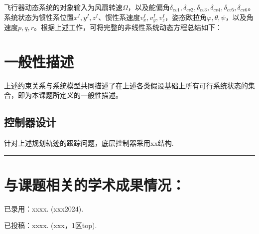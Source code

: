 \begin{ubox}
飞行器动态系统的对象输入为风扇转速$\Omega$，以及舵偏角$\delta_{cv1},\delta_{cv2},\delta_{cv3},\delta_{cv4},\delta_{cv5},\delta_{cv6}$。系统状态为惯性系位置$x^I,y^I,z^I$、惯性系速度$v_x^I,v_y^I,v_z^I$，姿态欧拉角$\varphi,\theta,\psi$，以及角速度$p,q,r$。根据上述工作，可将完整的非线性系统动态方程总结如下：




\section{一般性描述}


上述约束关系与系统模型共同描述了在上述各类假设基础上所有可行系统状态的集合，即为本课题所定义的一般性描述。



\subsection{控制器设计}

针对上述规划轨迹的跟踪问题，底层控制器采用xx结构.


\noindent\rule{1.01\linewidth}{0.3mm}

\section*{与课题相关的学术成果情况：}
已录用：xxxx. (xxx2024). 

已投稿：xxxx. (xxx，1区top). 

\end{ubox}


